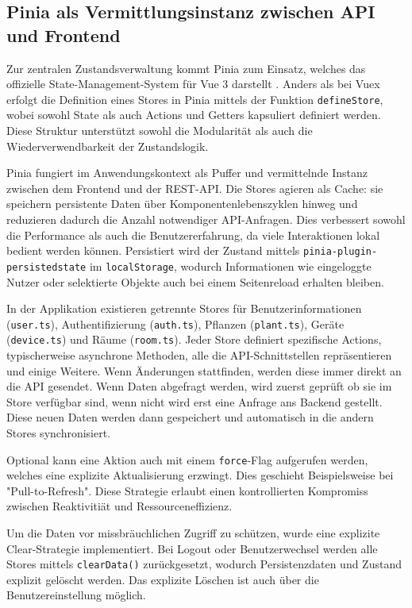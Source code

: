  \subsection{Pinia als Vermittlungsinstanz zwischen API und Frontend}
 Zur zentralen Zustandsverwaltung kommt Pinia zum Einsatz, welches das offizielle State-Management-System für Vue 3 darstellt \cite{Vuex, Allotey2023}. Anders als bei Vuex erfolgt die Definition eines Stores in Pinia mittels der Funktion \texttt{defineStore}, wobei sowohl State als auch Actions und Getters kapsuliert definiert werden. Diese Struktur unterstützt sowohl die Modularität als auch die Wiederverwendbarkeit der Zustandslogik.
 
 Pinia fungiert im Anwendungskontext als Puffer und vermittelnde Instanz zwischen dem Frontend und der REST-API. Die Stores agieren als Cache: sie speichern persistente Daten über Komponentenlebenszyklen hinweg und reduzieren dadurch die Anzahl notwendiger API-Anfragen. Dies verbessert sowohl die Performance als auch die Benutzererfahrung, da viele Interaktionen lokal bedient werden können. Persistiert wird der Zustand mittels \texttt{pinia-plugin-persistedstate} im \texttt{localStorage}, wodurch Informationen wie eingeloggte Nutzer oder selektierte Objekte auch bei einem Seitenreload erhalten bleiben.
 
 In der Applikation existieren getrennte Stores für Benutzerinformationen (\texttt{user.ts}), Authentifizierung (\texttt{auth.ts}), Pflanzen (\texttt{plant.ts}), Geräte (\texttt{device.ts}) und Räume (\texttt{room.ts}). Jeder Store definiert spezifische Actions, typischerweise asynchrone Methoden, alle die API-Schnittstellen repräsentieren und einige Weitere. Wenn Änderungen stattfinden, werden diese immer direkt an die API gesendet. Wenn Daten abgefragt werden, wird zuerst geprüft ob sie im Store verfügbar sind, wenn nicht wird erst eine Anfrage ans Backend gestellt. Diese neuen Daten werden dann gespeichert und automatisch in die andern Stores synchronisiert. 
 
 Optional kann eine Aktion auch mit einem \texttt{force}-Flag aufgerufen werden, welches eine explizite Aktualisierung erzwingt. Dies geschieht Beispielsweise bei "Pull-to-Refresh". Diese Strategie erlaubt einen kontrollierten Kompromiss zwischen Reaktivitiät und Ressourceneffizienz.
 
Um die Daten vor missbräuchlichen Zugriff zu schützen, wurde eine explizite Clear-Strategie implementiert. Bei Logout oder Benutzerwechsel werden alle Stores mittels \texttt{clearData()} zurückgesetzt, wodurch Persistenzdaten und Zustand explizit gelöscht werden. Das explizite Löschen ist auch über die Benutzereinstellung möglich.

